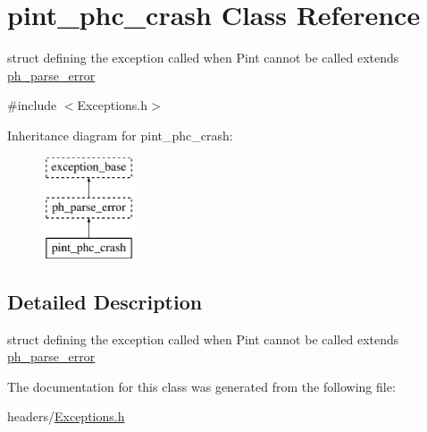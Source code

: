 \hypertarget{structpint__phc__crash}{\section{pint\-\_\-phc\-\_\-crash \-Class \-Reference}
\label{structpint__phc__crash}
}


struct defining the exception called when \-Pint cannot be called extends \hyperlink{structph__parse__error}{ph\-\_\-parse\-\_\-error}  




{\ttfamily \#include $<$\-Exceptions.\-h$>$}

\-Inheritance diagram for pint\-\_\-phc\-\_\-crash\-:\begin{figure}[H]
\begin{center}
\leavevmode
\includegraphics[height=3.000000cm]{structpint__phc__crash}
\end{center}
\end{figure}


\subsection{\-Detailed \-Description}
struct defining the exception called when \-Pint cannot be called extends \hyperlink{structph__parse__error}{ph\-\_\-parse\-\_\-error} 

\-The documentation for this class was generated from the following file\-:\begin{DoxyCompactItemize}
\item 
headers/\hyperlink{_exceptions_8h}{\-Exceptions.\-h}\end{DoxyCompactItemize}
